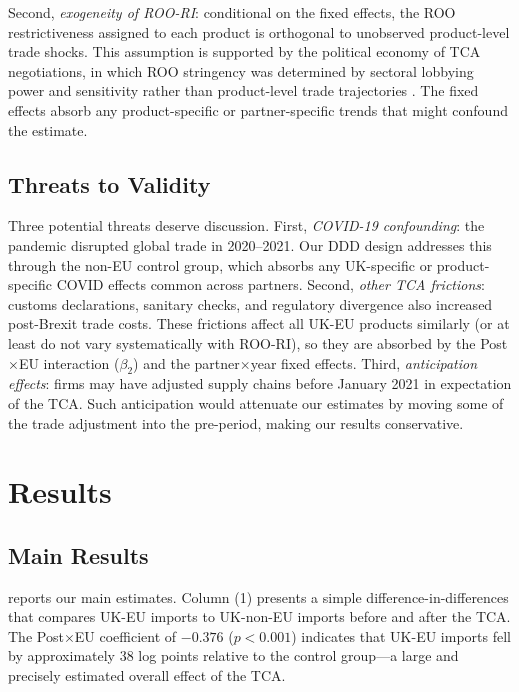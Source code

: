 \documentclass[12pt]{article}
\begin{document}
Second, \textit{exogeneity of ROO-RI}: conditional on the fixed effects, the ROO restrictiveness assigned to each product is orthogonal to unobserved product-level trade shocks. This assumption is supported by the political economy of TCA negotiations, in which ROO stringency was determined by sectoral lobbying power and sensitivity rather than product-level trade trajectories \citep{gasiorek2022}. The fixed effects absorb any product-specific or partner-specific trends that might confound the estimate.

\subsection{Threats to Validity}

Three potential threats deserve discussion. First, \textit{COVID-19 confounding}: the pandemic disrupted global trade in 2020--2021. Our DDD design addresses this through the non-EU control group, which absorbs any UK-specific or product-specific COVID effects common across partners. Second, \textit{other TCA frictions}: customs declarations, sanitary checks, and regulatory divergence also increased post-Brexit trade costs. These frictions affect all UK-EU products similarly (or at least do not vary systematically with ROO-RI), so they are absorbed by the Post$\times$EU interaction ($\beta_2$) and the partner$\times$year fixed effects. Third, \textit{anticipation effects}: firms may have adjusted supply chains before January 2021 in expectation of the TCA. Such anticipation would attenuate our estimates by moving some of the trade adjustment into the pre-period, making our results conservative.


\section{Results}

\subsection{Main Results}



 reports our main estimates. Column (1) presents a simple difference-in-differences that compares UK-EU imports to UK-non-EU imports before and after the TCA. The Post$\times$EU coefficient of $-0.376$ ($p < 0.001$) indicates that UK-EU imports fell by approximately 38 log points relative to the control group---a large and precisely estimated overall effect of the TCA.
\end{document}
